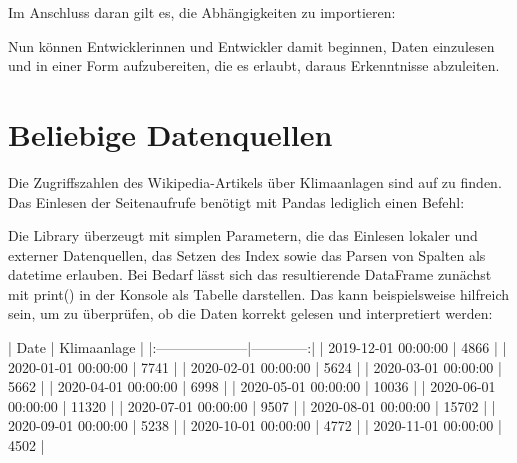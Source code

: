\medskip


\medskip

Im Anschluss daran gilt es, die Abhängigkeiten zu importieren:

\medskip





\medskip


Nun können Entwicklerinnen und Entwickler damit beginnen, Daten einzulesen und in einer Form aufzubereiten, die es erlaubt, daraus Erkenntnisse abzuleiten.

\section{Beliebige Datenquellen}

Die Zugriffszahlen des Wikipedia-Artikels über Klimaanlagen sind auf  zu finden. Das Einlesen der Seitenaufrufe benötigt mit Pandas lediglich einen Befehl:

\medskip




\medskip

Die Library überzeugt mit simplen Parametern, die das Einlesen lokaler und externer Datenquellen, das Setzen des Index sowie das Parsen von Spalten als datetime erlauben. Bei Bedarf lässt sich das resultierende DataFrame zunächst mit print() in der Konsole als Tabelle darstellen. Das kann beispielsweise hilfreich sein, um zu überprüfen, ob die Daten korrekt gelesen und interpretiert werden:

\medskip


| Date                | Klimaanlage |
|:--------------------|------------:|
| 2019-12-01 00:00:00 |        4866 |
| 2020-01-01 00:00:00 |        7741 |
| 2020-02-01 00:00:00 |        5624 |
| 2020-03-01 00:00:00 |        5662 |
| 2020-04-01 00:00:00 |        6998 |
| 2020-05-01 00:00:00 |       10036 |
| 2020-06-01 00:00:00 |       11320 |
| 2020-07-01 00:00:00 |        9507 |
| 2020-08-01 00:00:00 |       15702 |
| 2020-09-01 00:00:00 |        5238 |
| 2020-10-01 00:00:00 |        4772 |
| 2020-11-01 00:00:00 |        4502 |


